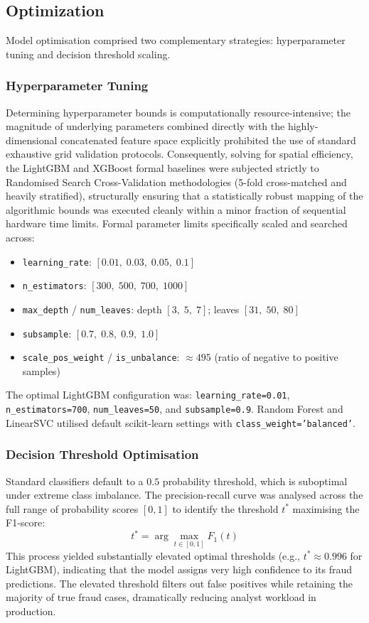 \documentclass[a4paper,fleqn]{cas-sc}
\begin{document}
\subsection{Optimization}

Model optimisation comprised two complementary strategies: hyperparameter tuning and decision threshold scaling.

\subsubsection{Hyperparameter Tuning}
Determining hyperparameter bounds is computationally resource-intensive; the magnitude of underlying parameters combined directly with the highly-dimensional concatenated feature space explicitly prohibited the use of standard exhaustive grid validation protocols. Consequently, solving for spatial efficiency, the LightGBM and XGBoost formal baselines were subjected strictly to Randomised Search Cross-Validation methodologies (5-fold cross-matched and heavily stratified), structurally ensuring that a statistically robust mapping of the algorithmic bounds was executed cleanly within a minor fraction of sequential hardware time limits. Formal parameter limits specifically scaled and searched across:
\begin{itemize}
    \item \texttt{learning\_rate}: $[0.01,\; 0.03,\; 0.05,\; 0.1]$
    \item \texttt{n\_estimators}: $[300,\; 500,\; 700,\; 1000]$
    \item \texttt{max\_depth} / \texttt{num\_leaves}: depth $[3,\; 5,\; 7]$; leaves $[31,\; 50,\; 80]$
    \item \texttt{subsample}: $[0.7,\; 0.8,\; 0.9,\; 1.0]$
    \item \texttt{scale\_pos\_weight} / \texttt{is\_unbalance}: $\approx 495$ (ratio of negative to positive samples)
\end{itemize}
The optimal LightGBM configuration was: \texttt{learning\_rate=0.01}, \texttt{n\_estimators=700}, \texttt{num\_leaves=50}, and \texttt{subsample=0.9}. Random Forest and LinearSVC utilised default scikit-learn settings with \texttt{class\_weight='balanced'}.

\subsubsection{Decision Threshold Optimisation}
Standard classifiers default to a $0.5$ probability threshold, which is suboptimal under extreme class imbalance. The precision-recall curve was analysed across the full range of probability scores $[0, 1]$ to identify the threshold $t^*$ maximising the F1-score:
\begin{equation}
t^* = \arg\max_{t \in [0,1]} F_1(t)
\label{eq:threshold}
\end{equation}
This process yielded substantially elevated optimal thresholds (e.g., $t^* \approx 0.996$ for LightGBM), indicating that the model assigns very high confidence to its fraud predictions. The elevated threshold filters out false positives while retaining the majority of true fraud cases, dramatically reducing analyst workload in production.
\end{document}
